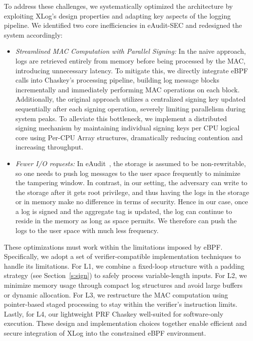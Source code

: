 \documentclass[sigconf]{sty/acmart}
\newcommand{\ed}{eAudit\xspace}
\newcommand{\edm}{eAudit-SEC\xspace}
\newcommand{\xlog}{XLog\xspace}
\begin{document}
To address these challenges, we systematically optimized the architecture by exploiting \xlog’s design properties and adapting key aspects of the logging pipeline. We identified two core inefficiencies in \edm and redesigned the system accordingly:


\begin{itemize}[leftmargin=*]
  \item \textit{Streamlined MAC Computation with Parallel Signing:}
  In the naive approach, logs are retrieved entirely from memory before being processed by the MAC, introducing unnecessary latency. To mitigate this, we directly integrate eBPF calls into Chaskey's processing pipeline, building log message blocks incrementally and immediately performing MAC operations on each block. Additionally, the original approach utilizes a centralized signing key updated sequentially after each signing operation, severely limiting parallelism during system peaks. To alleviate this bottleneck, we implement a distributed signing mechanism by maintaining individual signing keys per CPU logical core using Per-CPU Array structures, dramatically reducing contention and increasing throughput.

  \item \textit{Fewer I/O requests:} In \ed~\cite{Sekar2023eAA}, the storage is assumed to be non-rewritable,
  so one needs to push log messages to the user space frequently to minimize the tampering window.
  In contrast, in our setting, the adversary can write to the storage after it gets root privilege,
  and thus having the logs in the storage or in memory make no difference in terms of security.
  Hence in our case, once a log is signed and the aggregate tag is updated,
  the log can continue to reside in the memory as long as space permits.
  We therefore can push the logs to the user space with much less frequency.

\end{itemize}

These optimizations must work within the limitations imposed by eBPF. Specifically, we adopt a set of verifier-compatible implementation techniques to handle its limitations. For L1, we combine a fixed-loop structure with a padding strategy (see Section~\ref{s:sign}) to safely process variable-length inputs. For L2, we minimize memory usage through compact log structures and avoid large buffers or dynamic allocation. For L3, we restructure the MAC computation using pointer-based staged processing to stay within the verifier’s instruction limits. Lastly, for L4, our lightweight PRF Chaskey well-suited for software-only execution. These design and implementation choices together enable efficient and secure integration of \xlog into the constrained eBPF environment.
\end{document}
